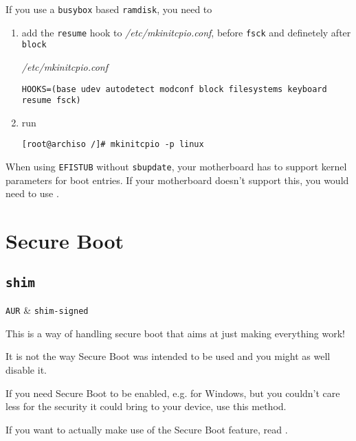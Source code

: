 \documentclass[10pt]{dustdoc}
\begin{document}
\begin{NOTE}
    If you use a \texttt{busybox} based \texttt{ramdisk}, you need to

    \begin{enumerate}
        \item add the \texttt{resume} hook to \textit{/etc/mkinitcpio.conf}, before \texttt{fsck} and definetely after \texttt{block}

            \begin{mintedlisting}
                \caption*{\textit{/etc/mkinitcpio.conf}}
                \begin{verbatim}
HOOKS=(base udev autodetect modconf block filesystems keyboard resume fsck)
                \end{verbatim}
            \end{mintedlisting}
        \item run

            \begin{verbatim}
[root@archiso /]# mkinitcpio -p linux
            \end{verbatim}
    \end{enumerate}
\end{NOTE}

\begin{NOTE}
    When using \texttt{EFISTUB} without \texttt{sbupdate}, your motherboard has to support kernel parameters for boot entries.
    If your motherboard doesn’t support this, you would need to use .
\end{NOTE}

\section{Secure Boot}
\label{sec:secure-boot}

\subsection{\texttt{shim}}
\label{sec:shim}

\begin{packagetable}
    \texttt{AUR} & \texttt{shim-signed} \\
\end{packagetable}

\begin{WARNING}
    This is a way of handling secure boot that aims at just making everything work!

    It is not the way Secure Boot was intended to be used and you might as well disable it.

    If you need Secure Boot to be enabled, e.g. for Windows, but you couldn’t care less for the security it could bring to your device, use this method.

    If you want to actually make use of the Secure Boot feature, read .
\end{WARNING}
\end{document}
